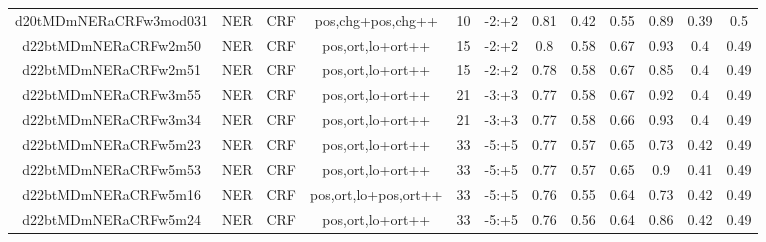 \documentclass[a4paper]{article}
\begin{document}
\begin{landscape}
\begin{center}
\begin{tabular}{ |c|c|c|c|c|c|c|c|c|c|c|c|}
 	
 
 	
 		
 		\small{ d20tMDmNERaCRFw3mod031 } & NER & CRF & pos,chg+pos,chg++  &  10 &  -2:+2  &  0.81 & 0.42 & 0.55  &  0.89 & 0.39 & 0.5 \\
 		

 	
 
 	
 		
 		\small{ d22btMDmNERaCRFw2m50 } & NER & CRF & pos,ort,lo+ort++  &  15 &  -2:+2  &  0.8 & 0.58 & 0.67  &  0.93 & 0.4 & 0.49 \\
 		

 	
 
 	
 		
 		\small{ d22btMDmNERaCRFw2m51 } & NER & CRF & pos,ort,lo+ort++  &  15 &  -2:+2  &  0.78 & 0.58 & 0.67  &  0.85 & 0.4 & 0.49 \\
 		

 	
 
 	
 		
 		\small{ d22btMDmNERaCRFw3m55 } & NER & CRF & pos,ort,lo+ort++  &  21 &  -3:+3  &  0.77 & 0.58 & 0.67  &  0.92 & 0.4 & 0.49 \\
 		

 	
 
 	
 		
 		\small{ d22btMDmNERaCRFw3m34 } & NER & CRF & pos,ort,lo+ort++  &  21 &  -3:+3  &  0.77 & 0.58 & 0.66  &  0.93 & 0.4 & 0.49 \\
 		

 	
 
 	
 		
 		\small{ d22btMDmNERaCRFw5m23 } & NER & CRF & pos,ort,lo+ort++  &  33 &  -5:+5  &  0.77 & 0.57 & 0.65  &  0.73 & 0.42 & 0.49 \\
 		

 	
 
 	
 		
 		\small{ d22btMDmNERaCRFw5m53 } & NER & CRF & pos,ort,lo+ort++  &  33 &  -5:+5  &  0.77 & 0.57 & 0.65  &  0.9 & 0.41 & 0.49 \\
 		

 	
 
 	
 		
 		\small{ d22btMDmNERaCRFw5m16 } & NER & CRF & pos,ort,lo+pos,ort++  &  33 &  -5:+5  &  0.76 & 0.55 & 0.64  &  0.73 & 0.42 & 0.49 \\
 		

 	
 
 	
 		
 		\small{ d22btMDmNERaCRFw5m24 } & NER & CRF & pos,ort,lo+ort++  &  33 &  -5:+5  &  0.76 & 0.56 & 0.64  &  0.86 & 0.42 & 0.49 \\
 		


\end{tabular}
\end{center}
\end{landscape}
\end{document}
